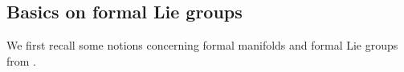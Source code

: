 \documentclass[12pt, a4paper]{amsart}
\theoremstyle{Theorem}
\theoremstyle{Theorem}
\theoremstyle{Theorem}
\theoremstyle{Theorem}
\theoremstyle{Plain}
\theoremstyle{remark}
\theoremstyle{remark}
\theoremstyle{Definition}
\numberwithin{equation}{section}
\begin{document}












\subsection{Basics on formal Lie groups}\label{sec:forLie}
We first recall some notions concerning formal manifolds and formal Lie groups from \cite{CSW1, CSW4}.
\end{document}
